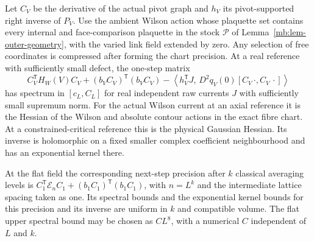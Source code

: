 \documentclass[11pt,letterpaper,reqno]{amsart}
\makeatletter
\numberwithin{equation}{section}
\theoremstyle{definition}
\newcommand{\ms@majorstart}{%
  \pushQED{\qed}\renewcommand{\qedsymbol}{$\blacksquare\square$}}
\newenvironment{corollary}[1][]{\ms@majorstart\ms@corollary[#1]}
  {\popQED\endms@corollary}
\theoremstyle{remark}
\makeatother
\begin{document}
\begin{corollary}[Actual contour precisions]\label{mb:cor-contour-gap}
Let \(C_V\) be the derivative of the actual pivot graph and
\(h_V\) its pivot-supported right inverse of \(P_V\).
Use the ambient Wilson action whose plaquette set contains
every internal and face-comparison plaquette in the stock $\mathcal P$ of Lemma~\ref{mb:lem-outer-geometry}, with the varied link field
extended by zero. Any selection of free coordinates is
compressed after forming the chart precision.
At a real reference with sufficiently small defect, the one-step
matrix
\begin{equation}\label{mb:eq-one-step-contour}
 C_V^{\mathsf T}H_W(V)C_V+(b_VC_V)^{\mathsf T}(b_VC_V)
  -\left\langle h_V^{\mathsf T}J,\,
                         D^2q_V(0)[C_V\,\cdot,C_V\,\cdot]\right\rangle
\end{equation}
has spectrum in \([c_L,C_L]\) for real independent raw currents
\(J\) with sufficiently small supremum norm. For the actual
Wilson current at an axial reference it is the Hessian of the
Wilson and absolute contour actions in the exact fibre chart.
At a constrained-critical reference this is the physical
Gaussian Hessian. Its inverse is
holomorphic on a fixed smaller complex coefficient
neighbourhood and has an exponential kernel there.

At the flat field the corresponding next-step precision
after \(k\) classical averaging levels is
\(C_1^{\mathsf T}\mathcal E_n C_1+
 (b_1C_1)^{\mathsf T}(b_1C_1)\), with \(n=L^k\) and the
intermediate lattice spacing taken as one. Its spectral bounds
and the exponential kernel bounds for this precision and its
inverse are uniform in \(k\) and compatible volume.
The flat upper spectral bound may be chosen as $CL^8$,
with a numerical $C$ independent of $L$ and $k$.
\end{corollary}
\end{document}

